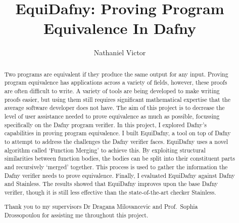 \documentclass[a4paper, twoside]{report}
\title{EquiDafny: Proving Program Equivalence In Dafny}
\author{Nathaniel Victor}
\begin{document}


\begin{abstract}
Two programs are equivalent if they produce the same output for any input. Proving program equivalence has applications across a variety of fields, however, these proofs are often difficult to write. A variety of tools are being developed to make writing proofs easier, but using them still requires significant mathematical expertise that the average software developer does not have. The aim of this project is to decrease the level of user assistance needed to prove equivalence as much as possible, focussing specifically on the Dafny program verifier. In this project, I explored Dafny's capabilities in proving program equivalence. I built EquiDafny, a tool on top of Dafny to attempt to address the challenges the Dafny verifier faces. EquiDafny uses a novel algorithm called `Function Merging' to achieve this. By exploiting structural similarities between function bodies, the bodies can be split into their constituent parts and recursively `merged' together. This process is used to gather the information the Dafny verifier needs to prove equivalence. Finally, I evaluated EquiDafny against Dafny and Stainless. The results showed that EquiDafny improves upon the base Dafny verifier, though it is still less effective than the state-of-the-art checker Stainless.
\end{abstract}

\renewcommand{\abstractname}{Acknowledgements}
\begin{abstract}
Thank you to my supervisors Dr Dragana Milovancevic and Prof.~Sophia Drossopoulou for assisting me throughout this project.
\end{abstract}

\tableofcontents



% 




\printbibliography%

\end{document}

